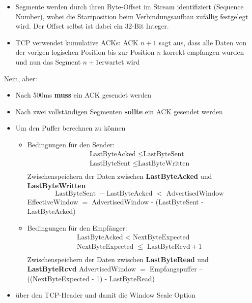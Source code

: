 
\begin{itemize}
    \item Segmente werden durch ihren Byte-Offset im Stream identifiziert (Sequence Number), wobei die Startposition beim Verbindungsaufbau zufällig festgelegt wird.
    Der Offset selbst ist dabei ein 32-Bit Integer.
    \item TCP verwendet kumulative ACKs: ACK $n+1$ sagt aus, dass alle Daten von der vorigen logischen Position bis zur Position $n$ korrekt empfangen wurden und nun das Segment $n+1$erwartet wird
\end{itemize}

Nein, aber:
\begin{itemize}
    \item Nach 500ms \textbf{muss} ein ACK gesendet werden
    \item Nach zwei vollständigen Segmenten \textbf{sollte} ein ACK gesendet werden
\end{itemize}

\begin{itemize}
    \item Um den Puffer berechnen zu können
    \begin{itemize}
        \item Bedingungen für den Sender:
        \begin{gather*}
            \text{LastByteAcked }\leq \text{LastByteSent}\\
            \text{LastByteSent }\leq \text{LastByteWritten}\\
        \end{gather*}
        Zwischenspeichern der Daten zwischen \textbf{LastByteAcked} und \textbf{LastByteWritten}
        \[\text{LastByteSent }- \text{LastByteAcked }< \text{ AdvertisedWindow}\]
        EffectiveWindow $=$ AdvertisedWindow - (LastByteSent - LastByteAcked)
        \item Bedingungen für den Empfänger:
        \begin{gather*}
            \text{LastByteAcked }<\text{ NextByteExpected}\\
            \text{NextByteExpected }\leq \text{ LastByteRcvd} + 1\\
        \end{gather*}
        Zwischenspeichern der Daten zwischen \textbf{LastByteRead} und \textbf{LastByteRcvd}
        AdvertisedWindow $=$ Empfangspuffer – ((NextByteExpected - 1) - LastByteRead)
    \end{itemize}
    \item über den TCP-Header und damit die Window Scale Option
\end{itemize}

